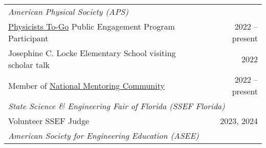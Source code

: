 \documentclass[letterpaper,11pt]{article}
\begin{document}
\begin{longtable}{@{}p{}r@{}}
  \multicolumn{2}{l}{\hspace{1mm} \textit{American Physical Society (APS)}}                                                                                                                                                                                                                     \\ [3pt]
  \hspace{7mm} \href{https://www.aps.org/programs/outreach/physiciststogo.cfm}{Physicists To-Go} Public Engagement Program Participant                                                                            & 2022 -- present                                                             \\ [3pt]
  \hspace{7mm} Josephine C. Locke Elementary School visiting scholar talk                                                                                                                                         & 2022                                                                        \\ [3pt]
  \hspace{7mm} Member of \href{https://www.aps.org/initiatives/physics-education/national-mentoring-community}{National Mentoring Community}                                                                      & 2022 -- present                                                             \\ [4pt]
  \multicolumn{2}{l}{\hspace{1mm} \textit{State Science \& Engineering Fair of Florida (SSEF Florida)}}                                                                                                                                                                                         \\ [3pt]
  \hspace{7mm} Volunteer SSEF Judge                                                                                                                                                                               & 2023, 2024                                                                  \\ [4pt]
  \multicolumn{2}{l}{\hspace{1mm} \textit{American Society for Engineering Education (ASEE)}}                                                                                                                                                                                                   \\ [3pt]

\end{longtable}
\end{document}
